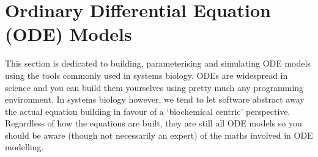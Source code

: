 \documentclass[../main]{subfiles}
\begin{document}
    \section{Ordinary Differential Equation (ODE) Models}
    This section is dedicated to building, parameterising and simulating ODE models using the tools
    commonly used in systems biology. ODEs are widespread in science and you can build them yourselves
    using pretty much any programming environment. In systems biology however, we tend to let
    software abstract away the actual equation building in favour of a `biochemical centric' perspective. Regardless
    of how the equations are built, they are still all ODE models so you should be aware (though not necessarily an
    expert) of the maths involved in ODE modelling.

    
    
\end{document}
